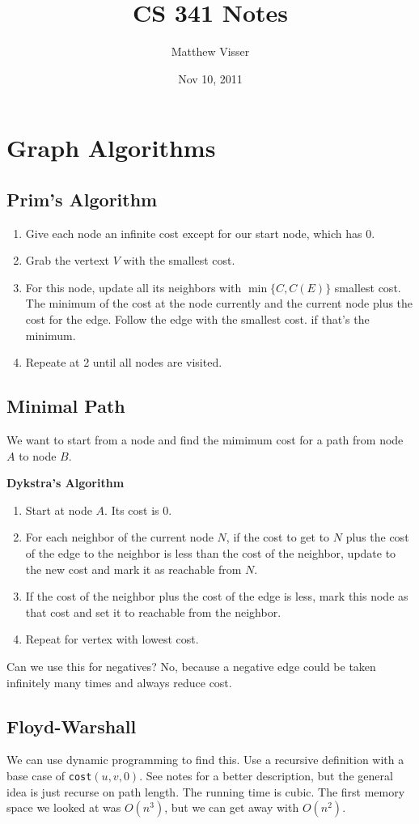 \documentclass[12pt]{article}
\begin{document}
\title{CS 341 Notes}
\author{Matthew Visser}
\date{Nov 10, 2011}
\maketitle

\section{Graph Algorithms}

\subsection{Prim's Algorithm}

\begin{enumerate}
	\item Give each node an infinite cost except for our start node, which has 0.
	\item Grab the vertext $V$ with the smallest cost.
	\item For this node, update all its neighbors with $\min\{C,C(E)\}$ smallest
		cost. The minimum of the cost at the node currently and the current node
		plus the cost for the edge. Follow the edge with the smallest cost. if
		that's the minimum.
	\item Repeate at 2 until all nodes are visited.
\end{enumerate}

\subsection{Minimal Path}

We want to start from a node and find the mimimum cost for a path from node $A$
to node $B$.

\textbf{Dykstra's Algorithm}

\begin{enumerate}
	\item Start at node $A$. Its cost is 0.
	\item For each neighbor of the current node $N$, if the cost to get to $N$
		plus the cost of the edge to the neighbor is less than the cost of the
		neighbor, update to the new cost and mark it as reachable from $N$.
	\item If the cost of the neighbor plus the cost of the edge is less, mark
		this node as that cost and set it to reachable from the neighbor.
	\item Repeat for vertex with lowest cost.
\end{enumerate}

Can we use this for negatives? No, because a negative edge could be taken
infinitely many times and always reduce cost.

\subsection{Floyd-Warshall}

We can use dynamic programming to find this. Use a recursive definition with a
base case of \texttt{cost}$(u,v,0)$. See notes for a better description, but the
general idea is just recurse on path length. The running time is cubic. The
first memory space we looked at was $O(n^3)$, but we can get away with $O(n^2)$.
\end{document}

